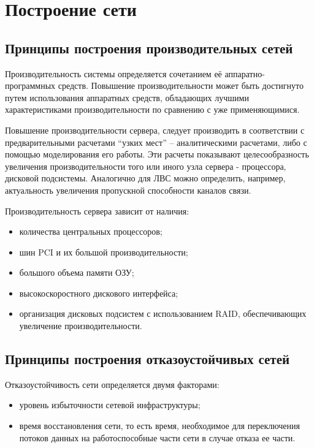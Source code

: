 \newpage

\section{Построение сети}

\subsection{Принципы построения производительных сетей}

Производительность системы определяется сочетанием её аппаратно- программных средств. Повышение производительности может быть достигнуто путем использования аппаратных средств, обладающих лучшими характеристиками производительности по сравнению с уже применяющимися.\par\bigskip

Повышение производительности сервера, следует производить в соответствии с предварительными расчетами “узких мест” – аналитическими расчетами, либо с помощью моделирования его работы. Эти расчеты показывают целесообразность увеличения производительности того или иного узла сервера - процессора, дисковой подсистемы. Аналогично для ЛВС можно определить, например, актуальность увеличения пропускной способности каналов связи.\par\bigskip

Производительность сервера зависит от наличия: 
\begin{itemize}
\item количества центральных процессоров;
\item шин PCI и их большой производительности;
\item большого объема памяти ОЗУ;
\item высокоскоростного дискового интерфейса;
\item организация дисковых подсистем с использованием RAID, обеспечивающих увеличение производительности.
\end{itemize}

\subsection{Принципы построения отказоустойчивых сетей}

Отказоустойчивость сети определяется двумя факторами:
\begin{itemize}
\item уровень избыточности сетевой инфраструктуры;
\item время восстановления сети, то есть время, необходимое для переключения потоков данных на работоспособные части сети в случае отказа ее части.
\end{itemize}\par\bigskip


